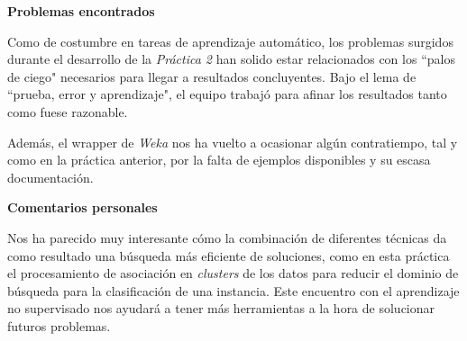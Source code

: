 \documentclass[12pt]{article}
\begin{document}
\vspace{0.5cm}
\centerline{\textbf{Problemas encontrados}}
\vspace{0.5cm}

Como de costumbre en tareas de aprendizaje automático, los problemas surgidos durante el desarrollo de la \textit{Práctica 2} han solido estar relacionados con los ``palos de ciego" necesarios para llegar a resultados concluyentes. Bajo el lema de ``prueba, error y aprendizaje", el equipo trabajó para afinar los resultados tanto como fuese razonable.

Además, el wrapper de \textit{Weka} nos ha vuelto a ocasionar algún contratiempo, tal y como en la práctica anterior, por la falta de ejemplos disponibles y su escasa documentación.

\vspace{0.5cm}
\centerline{\textbf{Comentarios personales}}
\vspace{0.5cm}

Nos ha parecido muy interesante cómo la combinación de diferentes técnicas da como resultado una búsqueda más eficiente de soluciones, como en esta práctica el procesamiento de asociación en \textit{clusters} de los datos para reducir el dominio de búsqueda para la clasificación de una instancia. Este encuentro con el aprendizaje no supervisado nos ayudará a tener más herramientas a la hora de solucionar futuros problemas.
\end{document}
